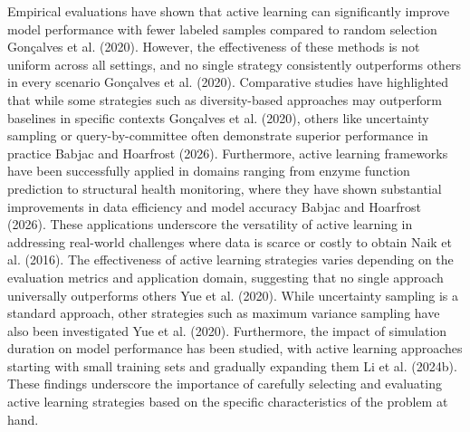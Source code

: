 Empirical evaluations have shown that active learning can significantly improve model performance with fewer labeled samples compared to random selection Gonçalves et al. (2020). However, the effectiveness of these methods is not uniform across all settings, and no single strategy consistently outperforms others in every scenario Gonçalves et al. (2020). Comparative studies have highlighted that while some strategies such as diversity-based approaches may outperform baselines in specific contexts Gonçalves et al. (2020), others like uncertainty sampling or query-by-committee often demonstrate superior performance in practice Babjac and Hoarfrost (2026). Furthermore, active learning frameworks have been successfully applied in domains ranging from enzyme function prediction to structural health monitoring, where they have shown substantial improvements in data efficiency and model accuracy Babjac and Hoarfrost (2026). These applications underscore the versatility of active learning in addressing real-world challenges where data is scarce or costly to obtain Naik et al. (2016). The effectiveness of active learning strategies varies depending on the evaluation metrics and application domain, suggesting that no single approach universally outperforms others Yue et al. (2020). While uncertainty sampling is a standard approach, other strategies such as maximum variance sampling have also been investigated Yue et al. (2020). Furthermore, the impact of simulation duration on model performance has been studied, with active learning approaches starting with small training sets and gradually expanding them Li et al. (2024b). These findings underscore the importance of carefully selecting and evaluating active learning strategies based on the specific characteristics of the problem at hand.

